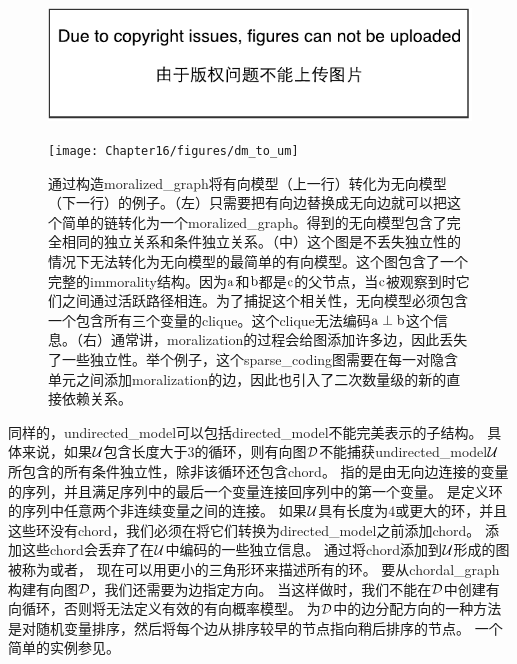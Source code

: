 \begin{figure}[!htb]
\ifOpenSource
\centerline{\includegraphics{figure.pdf}}
\else
	\centerline{\texttt{[image: Chapter16/figures/dm\_to\_um]}}	
\fi
	\caption{通过构造\gls{moralized_graph}将有向模型（上一行）转化为无向模型（下一行）的例子。（左）只需要把有向边替换成无向边就可以把这个简单的链转化为一个\gls{moralized_graph}。得到的无向模型包含了完全相同的独立关系和条件独立关系。（中）这个图是不丢失独立性的情况下无法转化为无向模型的最简单的有向模型。这个图包含了一个完整的\gls{immorality}结构。因为$\mathrm{a}$和$\mathrm{b}$都是$\mathrm{c}$的父节点，当$\mathrm{c}$被观察到时它们之间通过活跃路径相连。为了捕捉这个相关性，无向模型必须包含一个包含所有三个变量的\gls{clique}。这个\gls{clique}无法编码$\mathrm{a} \perp \mathrm{b}$这个信息。（右）通常讲，\gls{moralization}的过程会给图添加许多边，因此丢失了一些独立性。举个例子，这个\gls{sparse_coding}图需要在每一对隐含单元之间添加\gls{moralization}的边，因此也引入了二次数量级的新的直接依赖关系。}
	\label{fig:dm_to_um}
\end{figure}



同样的，\gls{undirected_model}可以包括\gls{directed_model}不能完美表示的子结构。
具体来说，如果$\mathcal{U}$包含长度大于$3$的循环，则有向图$\mathcal{D}$不能捕获\gls{undirected_model}$\mathcal{U}$所包含的所有条件独立性，除非该循环还包含\gls{chord}。
指的是由无向边连接的变量的序列，并且满足序列中的最后一个变量连接回序列中的第一个变量。
是定义环的序列中任意两个非连续变量之间的连接。
如果$\mathcal{U}$具有长度为$4$或更大的环，并且这些环没有\gls{chord}，我们必须在将它们转换为\gls{directed_model}之前添加\gls{chord}。
添加这些\gls{chord}会丢弃了在$\mathcal{U}$中编码的一些独立信息。
通过将\gls{chord}添加到$\mathcal{U}$形成的图被称为或者，
现在可以用更小的三角形环来描述所有的环。
要从\gls{chordal_graph}构建有向图$\mathcal{D}$，我们还需要为边指定方向。
当这样做时，我们不能在$\mathcal{D}$中创建有向循环，否则将无法定义有效的有向概率模型。
为$\mathcal{D}$中的边分配方向的一种方法是对随机变量排序，然后将每个边从排序较早的节点指向稍后排序的节点。
一个简单的实例参见。


